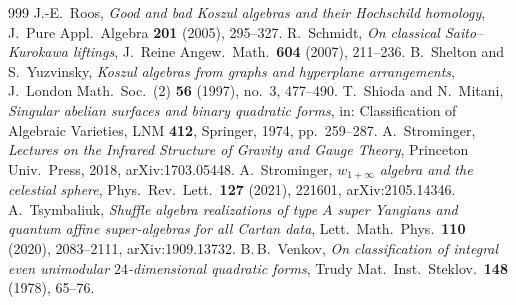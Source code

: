 \begin{thebibliography}{999}
 J.-E.~Roos, \emph{Good and bad Koszul algebras and their Hochschild homology}, J.~Pure Appl.\ Algebra \textbf{201} (2005), 295--327.
 R.~Schmidt, \emph{On classical Saito--Kurokawa liftings}, J.~Reine Angew.\ Math.\ \textbf{604} (2007), 211--236.
 B.~Shelton and S.~Yuzvinsky, \emph{Koszul algebras from graphs and hyperplane arrangements}, J.~London Math.\ Soc.\ (2) \textbf{56} (1997), no.~3, 477--490.
 T.~Shioda and N.~Mitani, \emph{Singular abelian surfaces and binary quadratic forms}, in: Classification of Algebraic Varieties, LNM \textbf{412}, Springer, 1974, pp.~259--287.
 A.~Strominger, \emph{Lectures on the Infrared Structure of Gravity and Gauge Theory}, Princeton Univ.\ Press, 2018, arXiv:1703.05448.
 A.~Strominger, \emph{$w_{1+\infty}$ algebra and the celestial sphere}, Phys.\ Rev.\ Lett.\ \textbf{127} (2021), 221601, arXiv:2105.14346.
 A.~Tsymbaliuk, \emph{Shuffle algebra realizations of type $A$ super Yangians and quantum affine super-algebras for all Cartan data}, Lett.\ Math.\ Phys.\ \textbf{110} (2020), 2083--2111, arXiv:1909.13732.
 B.\,B.~Venkov, \emph{On classification of integral even unimodular $24$-dimensional quadratic forms}, Trudy Mat.\ Inst.\ Steklov.\ \textbf{148} (1978), 65--76.


\end{thebibliography}
